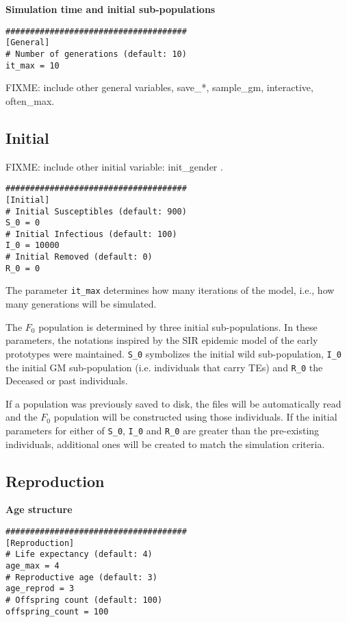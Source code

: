 \documentclass[10pt]{article}
\begin{document}
{\bf Simulation time and initial sub-populations}

\begin{verbatim}
#####################################
[General]
# Number of generations (default: 10)
it_max = 10
\end{verbatim}

FIXME: include other general variables, save\_*, sample\_gm,
interactive, often\_max.

\subsection{Initial}
\label{sec:default_config_initial}

FIXME: include other initial variable: init\_gender .

\begin{verbatim}
#####################################
[Initial]
# Initial Susceptibles (default: 900)
S_0 = 0
# Initial Infectious (default: 100)
I_0 = 10000
# Initial Removed (default: 0)
R_0 = 0
\end{verbatim}

The parameter \verb$it_max$ determines how many iterations of the model,
i.e., how many generations will be simulated.

The $F_0$ population is determined by three initial sub-populations. In
these parameters, the notations inspired by the SIR epidemic model of
the early prototypes were maintained. \verb$S_0$ symbolizes the
initial wild sub-population, \verb$I_0$ the initial GM sub-population
(i.e. individuals that carry TEs) and \verb$R_0$ the Deceased or past
individuals.

If a population was previously saved to disk, the files will be
automatically read and the $F_0$ population will be constructed using
those individuals. If the initial parameters for either of \verb$S_0$,
\verb$I_0$ and \verb$R_0$ are greater than the pre-existing
individuals, additional ones will be created to match the simulation
criteria.


\subsection{Reproduction}
\label{sec:default_config_reproduction}

{\bf Age structure}

\begin{verbatim}
#####################################
[Reproduction]
# Life expectancy (default: 4)
age_max = 4
# Reproductive age (default: 3)
age_reprod = 3
# Offspring count (default: 100)
offspring_count = 100
\end{verbatim}
\end{document}
